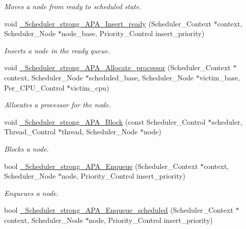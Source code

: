 \begin{DoxyCompactItemize}
\begin{DoxyCompactList}\small\item\em Moves a node from ready to scheduled state. \end{DoxyCompactList}\item 
void \hyperlink{group__RTEMSScoreSchedulerStrongAPA_ga5a79348c507857c0a09abdace0fb6998}{\+\_\+\+Scheduler\+\_\+strong\+\_\+\+A\+P\+A\+\_\+\+Insert\+\_\+ready} (Scheduler\+\_\+\+Context $\ast$context, Scheduler\+\_\+\+Node $\ast$node\+\_\+base, Priority\+\_\+\+Control insert\+\_\+priority)
\begin{DoxyCompactList}\small\item\em Inserts a node in the ready queue. \end{DoxyCompactList}\item 
void \hyperlink{group__RTEMSScoreSchedulerStrongAPA_gae011d69d2355e74ed27d606f79a3a954}{\+\_\+\+Scheduler\+\_\+strong\+\_\+\+A\+P\+A\+\_\+\+Allocate\+\_\+processor} (Scheduler\+\_\+\+Context $\ast$context, Scheduler\+\_\+\+Node $\ast$scheduled\+\_\+base, Scheduler\+\_\+\+Node $\ast$victim\+\_\+base, Per\+\_\+\+C\+P\+U\+\_\+\+Control $\ast$victim\+\_\+cpu)
\begin{DoxyCompactList}\small\item\em Allocates a processor for the node. \end{DoxyCompactList}\item 
void \hyperlink{group__RTEMSScoreSchedulerStrongAPA_gae7875a7e75f2615c6603155126d437db}{\+\_\+\+Scheduler\+\_\+strong\+\_\+\+A\+P\+A\+\_\+\+Block} (const Scheduler\+\_\+\+Control $\ast$scheduler, Thread\+\_\+\+Control $\ast$thread, Scheduler\+\_\+\+Node $\ast$node)
\begin{DoxyCompactList}\small\item\em Blocks a node. \end{DoxyCompactList}\item 
bool \hyperlink{group__RTEMSScoreSchedulerStrongAPA_ga1cf4d5dd4a1c9ccec8f78e5d6880c0d0}{\+\_\+\+Scheduler\+\_\+strong\+\_\+\+A\+P\+A\+\_\+\+Enqueue} (Scheduler\+\_\+\+Context $\ast$context, Scheduler\+\_\+\+Node $\ast$node, Priority\+\_\+\+Control insert\+\_\+priority)
\begin{DoxyCompactList}\small\item\em Enqueues a node. \end{DoxyCompactList}\item 
bool \hyperlink{group__RTEMSScoreSchedulerStrongAPA_gaaed11d4bb8de23df31deed2551fb7034}{\+\_\+\+Scheduler\+\_\+strong\+\_\+\+A\+P\+A\+\_\+\+Enqueue\+\_\+scheduled} (Scheduler\+\_\+\+Context $\ast$context, Scheduler\+\_\+\+Node $\ast$node, Priority\+\_\+\+Control insert\+\_\+priority)

\end{DoxyCompactItemize}
